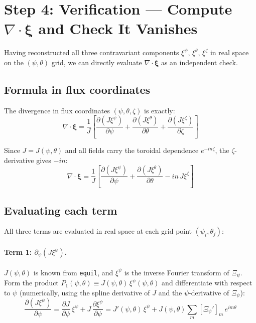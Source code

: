 \documentclass[12pt,a4paper]{article}
\newcommand{\bxi}{\boldsymbol{\xi}}
\begin{document}
\section{Step 4: Verification --- Compute $\nabla\cdot\bxi$ and Check It Vanishes}

Having reconstructed all three contravariant components $\xi^\psi$, $\xi^\theta$, $\xi^\zeta$ in real space on the $(\psi,\theta)$ grid, we can directly evaluate $\nabla\cdot\bxi$ as an independent check.

\subsection{Formula in flux coordinates}

The divergence in flux coordinates $(\psi,\theta,\zeta)$ is exactly:
\begin{equation}
    \nabla\cdot\bxi = \frac{1}{J}\left[
        \frac{\partial(J\xi^\psi)}{\partial\psi}
        + \frac{\partial(J\xi^\theta)}{\partial\theta}
        + \frac{\partial(J\xi^\zeta)}{\partial\zeta}
    \right]
    \label{eq:div_exact}
\end{equation}

Since $J = J(\psi,\theta)$ and all fields carry the toroidal dependence $e^{-in\zeta}$, the $\zeta$-derivative gives $-in$:
\begin{equation}
    \nabla\cdot\bxi = \frac{1}{J}\left[
        \frac{\partial(J\xi^\psi)}{\partial\psi}
        + \frac{\partial(J\xi^\theta)}{\partial\theta}
        - in\,J\xi^\zeta
    \right]
    \label{eq:div_eval}
\end{equation}

\subsection{Evaluating each term}

All three terms are evaluated in real space at each grid point $(\psi_i, \theta_j)$:

\paragraph{Term 1: $\partial_\psi(J\xi^\psi)$.}
$J(\psi,\theta)$ is known from \texttt{equil}, and $\xi^\psi$ is the inverse Fourier transform of $\Xi_\psi$. Form the product $P_1(\psi,\theta) \equiv J(\psi,\theta)\,\xi^\psi(\psi,\theta)$ and differentiate with respect to $\psi$ (numerically, using the spline derivative of $J$ and the $\psi$-derivative of $\Xi_\psi$):
\begin{equation}
    \frac{\partial(J\xi^\psi)}{\partial\psi} = \frac{\partial J}{\partial\psi}\,\xi^\psi + J\,\frac{\partial\xi^\psi}{\partial\psi}
    = J'(\psi,\theta)\,\xi^\psi + J(\psi,\theta)\sum_m [\Xi_\psi']_m\,e^{im\theta}
\end{equation}
\end{document}
